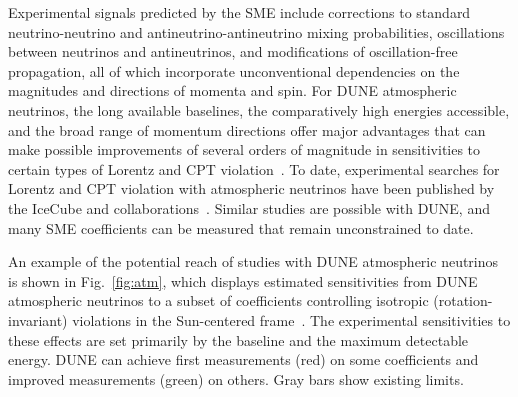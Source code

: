 Experimental signals predicted by the SME include
corrections to standard neutrino-neutrino 
and antineutrino-antineutrino mixing probabilities,
oscillations between neutrinos and antineutrinos,
and modifications of oscillation-free propagation,
all of which incorporate unconventional dependencies
on the magnitudes and directions of momenta and spin.
For DUNE atmospheric neutrinos,
the long available baselines,
the comparatively high energies accessible,
and the broad range of momentum directions
offer major advantages that can make possible 
improvements of several orders of magnitude
in sensitivities to certain types of Lorentz and CPT violation~\cite{Kostelecky:2003cr,Kostelecky:2011gq,Kostelecky:2003xn,Kostelecky:2004hg,Diaz:2009qk,Diaz:2013saa,Diaz:2013wia}.
To date,
experimental searches for Lorentz and CPT violation
with atmospheric neutrinos have been published 
by the IceCube and \superk collaborations~\cite{Abbasi:2010kx,Abe:2014wla,Aartsen:2017ibm}.
Similar studies are possible with DUNE,
and many SME coefficients can be measured that remain unconstrained to date.

An example of the potential reach of studies with DUNE atmospheric neutrinos
is shown in Fig.\ \ref{fig:atm},
which displays estimated sensitivities
from DUNE atmospheric neutrinos to a subset of coefficients 
controlling isotropic (rotation-invariant) violations 
in the Sun-centered frame~\cite{Kostelecky:2002hh}.
The experimental sensitivities to these effects
are set primarily by the baseline and the maximum detectable energy.
DUNE can achieve first measurements (red) on some coefficients
and improved measurements (green) on others.
Gray bars show existing limits.

